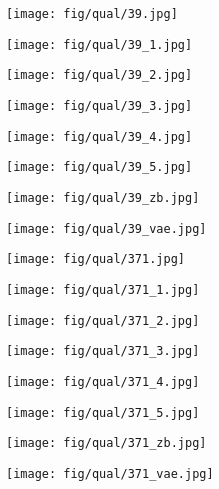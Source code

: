 \documentclass[10pt,twocolumn,letterpaper]{article}
\newcommand{\sz}{0.102}
\newcommand{\szl}{0.067}
\begin{document}
\begin{figure*}[t]
\begin{subfigure}[c]{\sz\linewidth}
\texttt{[image: fig/qual/39.jpg]}
\end{subfigure}
\begin{subfigure}[c]{\sz\linewidth}
\texttt{[image: fig/qual/39\_1.jpg]}
\end{subfigure}
\begin{subfigure}[c]{\sz\linewidth}
\texttt{[image: fig/qual/39\_2.jpg]}
\end{subfigure}
\begin{subfigure}[c]{\sz\linewidth}
\texttt{[image: fig/qual/39\_3.jpg]}
\end{subfigure}
\begin{subfigure}[c]{\sz\linewidth}
\texttt{[image: fig/qual/39\_4.jpg]}
\end{subfigure}
\hspace{3pt}
\begin{subfigure}[c]{\sz\linewidth}
\texttt{[image: fig/qual/39\_5.jpg]}
\end{subfigure}
\begin{subfigure}[c]{\szl\linewidth}
\texttt{[image: fig/qual/39\_zb.jpg]}
\end{subfigure}
\hspace{3pt}
\begin{subfigure}[c]{\szl\linewidth}
\texttt{[image: fig/qual/39\_vae.jpg]}
\end{subfigure}

\begin{subfigure}[c]{\sz\linewidth}
\texttt{[image: fig/qual/371.jpg]}
\end{subfigure}
\begin{subfigure}[c]{\sz\linewidth}
\texttt{[image: fig/qual/371\_1.jpg]}
\end{subfigure}
\begin{subfigure}[c]{\sz\linewidth}
\texttt{[image: fig/qual/371\_2.jpg]}
\end{subfigure}
\begin{subfigure}[c]{\sz\linewidth}
\texttt{[image: fig/qual/371\_3.jpg]}
\end{subfigure}
\begin{subfigure}[c]{\sz\linewidth}
\texttt{[image: fig/qual/371\_4.jpg]}
\end{subfigure}
\hspace{3pt}
\begin{subfigure}[c]{\sz\linewidth}
\texttt{[image: fig/qual/371\_5.jpg]}
\end{subfigure}
\begin{subfigure}[c]{\szl\linewidth}
\texttt{[image: fig/qual/371\_zb.jpg]}
\end{subfigure}
\hspace{3pt}
\begin{subfigure}[c]{\szl\linewidth}
\texttt{[image: fig/qual/371\_vae.jpg]}
\end{subfigure}


\end{figure*}
\end{document}
